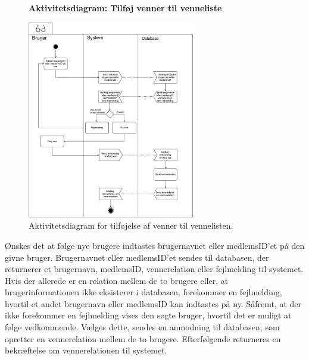 \begin{figure} [H]
\centering
\textbf{Aktivitetsdiagram: Tilføj venner til venneliste}\par\medskip
\includegraphics[width=0.65\textwidth]{figures/aktivitetsdiagram/foelgnyven}
\caption{Aktivitetsdiagram for tilføjelse af venner til vennelisten.}
\label{fig:tilfoejven}
\end{figure}

\noindent
Ønskes det at følge nye brugere indtastes brugernavnet eller medlemsID'et på den givne bruger. Brugernavnet eller medlemsID'et sendes til databasen, der returnerer et brugernavn, medlemsID, vennerelation eller fejlmelding til systemet. Hvis der allerede er en relation mellem de to brugere eller, at brugerinformationen ikke eksisterer i databasen, forekommer en fejlmelding, hvortil et andet brugernavn eller medlemsID kan indtastes på ny. 
Såfremt, at der ikke forekommer en fejlmelding vises den søgte bruger, hvortil det er muligt at følge vedkommende. 
Vælges dette, sendes en anmodning til databasen, som opretter en vennerelation mellem de to brugere. Efterfølgende returneres en bekræftelse om vennerelationen til systemet.